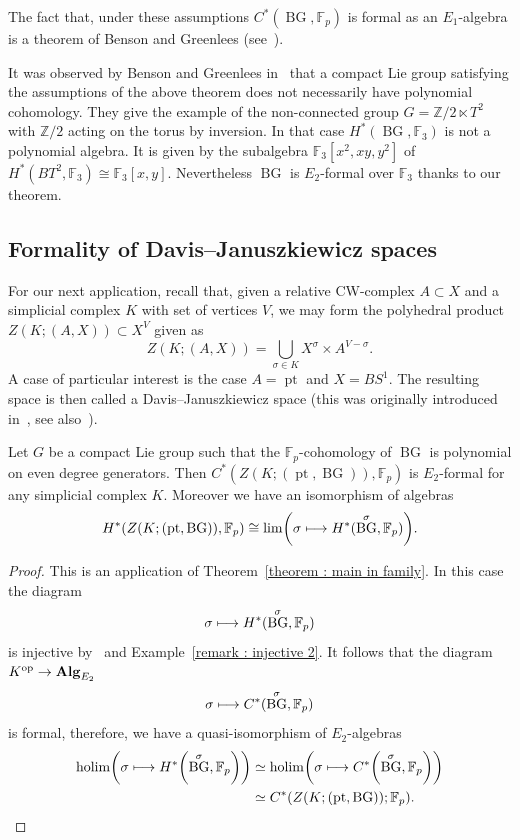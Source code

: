 \documentclass[AHL,Unicode,longabstracts,published]{cedram}
\DeclareMathOperator{\opp}{op}
\DeclareMathOperator{\holim}{holim}
\DeclareMathOperator{\BG}{BG}
\DeclareMathOperator{\ppt}{pt}
\newcommand{\alg}{\mathbf{Alg}}
\newcommand{\ZZ}{\mathbb{Z}}
\newcommand{\FF}{\mathbb{F}}
\renewcommand*{\to}{\mathchoice{\longrightarrow}{\rightarrow}{\rightarrow}{\rightarrow}}
\let\oldmapsto\mapsto
\renewcommand*{\mapsto}{\mathchoice{\longmapsto}{\oldmapsto}{\oldmapsto}{\oldmapsto}}
\let\originalleft\left
\let\originalright\right
\renewcommand{\left}{\mathopen{}\mathclose\bgroup\originalleft}
\renewcommand{\right}{\aftergroup\egroup\originalright}
\newcommand{\FF}{\mathbb{F}}
\begin{document}
\begin{rema}
The fact that, under these assumptions $C^*(\BG,\FF_p)$ is formal as an $E_1$-algebra is a theorem of Benson and Greenlees (see~\cite{bensonformality}).
\end{rema}

\begin{rema}
It was observed by Benson and Greenlees in~\cite{bensonformality} that a compact Lie group satisfying the assumptions of the above theorem does not necessarily have polynomial cohomology. They give the example of the non-connected group $G=\ZZ/2\ltimes T^2$ with $\ZZ/2$ acting on the torus by inversion. In that case $H^*(\BG,\FF_3)$ is not a polynomial algebra. It is given by the subalgebra $\FF_3[x^2,xy,y^2]$ of $H^*(BT^2,\FF_3)\cong\FF_3[x,y]$. Nevertheless $\BG$ is $E_2$-formal over $\FF_3$ thanks to our theorem.
\end{rema}



\subsection{Formality of Davis--Januszkiewicz spaces}

For our next application, recall that, given a relative CW-complex $A\subset X$ and a simplicial complex $K$ with set of vertices $V$, we may form the polyhedral product $Z(K;(A,X))\subset X^V$ given as
\[
Z(K;(A,X))=\bigcup_{\sigma\in K}X^{\sigma}\times A^{V-\sigma}.
\]
A case of particular interest is the case $A=\ppt$ and $X=BS^1$. The resulting space is then called a Davis--Januszkiewicz space (this was originally introduced in~\cite{davisjanu}, see also~\cite[Chapter~4]{buchstaberpanov}).

\begin{theo}\label{theorem : formality DJ space}
Let $G$ be a compact Lie group such that the $\FF_p$-cohomology of $\BG$ is polynomial on even degree generators. Then $C^*(Z(K;(\ppt,\BG)),\FF_p)$ is $E_2$-formal for any simplicial complex $K$. Moreover we have an isomorphism of algebras
\[
H^*\left(Z(K;(\ppt,\BG)),\FF_p\right)\cong\lim\left(\sigma\mapsto H^*(\BG^\sigma,\FF_p)\right).
\]
\end{theo}

\begin{proof}
This is an application of Theorem~\ref{theorem : main in family}. In this case the diagram
\[
\sigma\mapsto H^*(\BG^\sigma,\FF_p)
\]
is injective by~\cite[Lemma~3.8]{notbohmray} and Example~\ref{remark : injective 2}. It follows that the diagram $K^{\opp}\to\alg_{E_2}$
\[
\sigma\mapsto C^*(\BG^\sigma,\FF_p)
\]
is formal, therefore, we have a quasi-isomorphism of $E_2$-algebras
\begin{align*}
\holim\left(\sigma\mapsto H^*\left(\BG^\sigma,\FF_p\right)\right)&\simeq \holim\left(\sigma\mapsto C^*\left(\BG^\sigma,\FF_p\right)\right)\\
&\simeq C^*\left(Z(K;(\ppt,\BG));\FF_p\right).\qedhere
\end{align*}
\end{proof}
\end{document}
